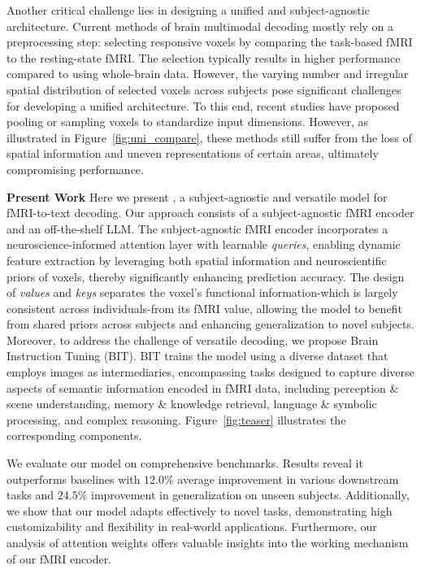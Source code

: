 Another critical challenge lies in designing a unified and subject-agnostic architecture. Current methods of brain multimodal decoding mostly rely on a preprocessing step: selecting responsive voxels by comparing the task-based fMRI to the resting-state fMRI. The selection typically results in higher performance compared to using whole-brain data. However, the varying number and irregular spatial distribution of selected voxels across subjects pose significant challenges for developing a unified architecture. To this end, recent studies \citep{wang2024mindbridge,wang2024unibrain} have proposed pooling or sampling voxels to standardize input dimensions. However, as illustrated in Figure~\ref{fig:uni_compare}, these methods still suffer from the loss of spatial information and uneven representations of certain areas, ultimately compromising performance.

\noindent\textbf{Present Work} Here we present \mindllm{}, a subject-agnostic and versatile model for fMRI-to-text decoding. Our approach consists of a subject-agnostic fMRI encoder and an off-the-shelf LLM. The subject-agnostic fMRI encoder incorporates a neuroscience-informed attention layer with learnable \textit{queries}, enabling dynamic feature extraction by leveraging both spatial information and neuroscientific priors of voxels, thereby significantly enhancing prediction accuracy. The design of \textit{values} and \textit{keys} separates the voxel's functional information-which is largely consistent across individuals-from its fMRI value, allowing the model to benefit from shared priors across subjects and enhancing generalization to novel subjects. Moreover, to address the challenge of versatile decoding, we propose Brain Instruction Tuning (BIT). BIT trains the model using a diverse dataset that employs images as intermediaries, encompassing tasks designed to capture diverse aspects of semantic information encoded in fMRI data, including perception \& scene understanding, memory \& knowledge retrieval, language \& symbolic processing, and complex reasoning. Figure~\ref{fig:teaser} illustrates the corresponding components.

We evaluate our model on comprehensive benchmarks. Results reveal it outperforms baselines with $12.0\%$ average improvement in various downstream tasks and $24.5\%$ improvement in generalization on unseen subjects. Additionally, we show that our model adapts effectively to novel tasks, demonstrating high customizability and flexibility in real-world applications. Furthermore, our analysis of attention weights offers valuable insights into the working mechanism of our fMRI encoder.
